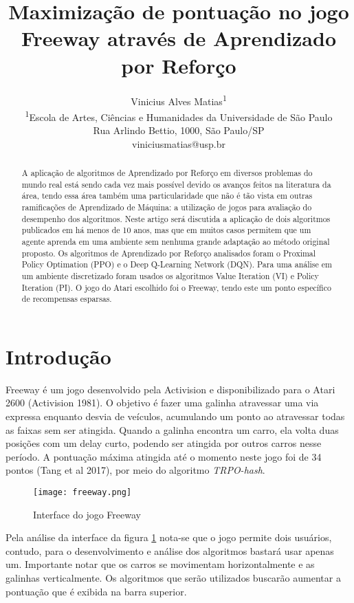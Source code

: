 \documentclass[letterpaper]{article} %
\title{Maximização de pontuação no jogo Freeway através de Aprendizado por Reforço}
\author{Vinicius Alves Matias\textsuperscript{\rm 1} \\ 
\textsuperscript{\rm 1}Escola de Artes, Ciências e Humanidades da Universidade de São Paulo\\ %
Rua Arlindo Bettio, 1000, São Paulo/SP\\
viniciusmatias@usp.br %
}
\begin{document}
\maketitle

\begin{abstract}
A aplicação de algoritmos de Aprendizado por Reforço em diversos problemas do mundo real está sendo cada vez mais possível devido os avanços feitos na literatura da área, tendo essa área também uma particularidade que não é tão vista em outras ramificações de Aprendizado de Máquina: a utilização de jogos para avaliação do desempenho dos algoritmos. Neste artigo será discutida a aplicação de dois algoritmos publicados em há menos de 10 anos,  mas que em muitos casos permitem que um agente aprenda em uma ambiente sem nenhuma grande adaptação ao método original proposto. Os algoritmos de Aprendizado por Reforço analisados foram o Proximal Policy Optimation (PPO) e o Deep Q-Learning Network (DQN). Para uma análise em um ambiente discretizado foram usados os algoritmos Value Iteration (VI) e Policy Iteration (PI). O jogo do Atari escolhido foi o Freeway, tendo este um ponto específico de recompensas esparsas. 
\end{abstract}

\section{Introdução}
Freeway é um jogo desenvolvido pela Activision e disponibilizado para o Atari 2600 (Activision 1981). O objetivo é fazer uma galinha atravessar uma via expressa enquanto desvia de veículos, acumulando um ponto ao atravessar todas as faixas sem ser atingida. Quando a galinha encontra um carro, ela volta duas posições com um delay curto, podendo ser atingida por outros carros nesse período. A pontuação máxima atingida até o momento neste jogo foi de 34 pontos (Tang et al 2017), por meio do algoritmo \textit{TRPO-hash}.

\begin{figure}[h]
\centering
\texttt{[image: freeway.png]}
\caption{Interface do jogo Freeway}
\label{fig:freeway}
\end{figure}

Pela análise da interface da figura \ref{fig:freeway} nota-se que o jogo permite dois usuários, contudo, para o desenvolvimento e análise dos algoritmos bastará usar apenas um. Importante notar que os carros se movimentam horizontalmente e as galinhas verticalmente. Os algoritmos que serão utilizados buscarão aumentar a pontuação que é exibida na barra superior.
\end{document}
